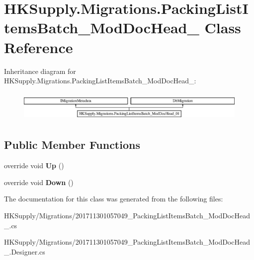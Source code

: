 \hypertarget{class_h_k_supply_1_1_migrations_1_1_packing_list_items_batch___mod_doc_head__01}{}\section{H\+K\+Supply.\+Migrations.\+Packing\+List\+Items\+Batch\+\_\+\+Mod\+Doc\+Head\+\_ Class Reference}
\label{class_h_k_supply_1_1_migrations_1_1_packing_list_items_batch___mod_doc_head__01}
Inheritance diagram for H\+K\+Supply.\+Migrations.\+Packing\+List\+Items\+Batch\+\_\+\+Mod\+Doc\+Head\+\_\+:\begin{figure}[H]
\begin{center}
\leavevmode
\includegraphics[height=1.501341cm]{class_h_k_supply_1_1_migrations_1_1_packing_list_items_batch___mod_doc_head__01}
\end{center}
\end{figure}
\subsection*{Public Member Functions}
\begin{DoxyCompactItemize}
\item 
\mbox{\label{class_h_k_supply_1_1_migrations_1_1_packing_list_items_batch___mod_doc_head__01_a749bbcb9550f8ee136a8ae68a45b4859}} 
override void {\bfseries Up} ()
\item 
\mbox{\label{class_h_k_supply_1_1_migrations_1_1_packing_list_items_batch___mod_doc_head__01_afe5db53bcf3803d5610dd411468e220b}} 
override void {\bfseries Down} ()
\end{DoxyCompactItemize}


The documentation for this class was generated from the following files\+:\begin{DoxyCompactItemize}
\item 
H\+K\+Supply/\+Migrations/201711301057049\+\_\+\+Packing\+List\+Items\+Batch\+\_\+\+Mod\+Doc\+Head\+\_.\+cs\item 
H\+K\+Supply/\+Migrations/201711301057049\+\_\+\+Packing\+List\+Items\+Batch\+\_\+\+Mod\+Doc\+Head\+\_.\+Designer.\+cs\end{DoxyCompactItemize}
